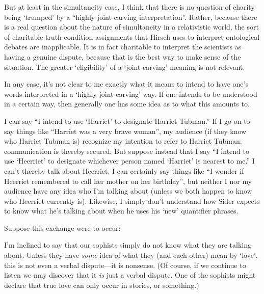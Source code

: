\documentclass[11pt]{article}
\begin{document}
\begin{spacing}{1.25}
But at least in the simultaneity case, I think that there is no
question of charity being `trumped' by a ``highly joint-carving
interpretation''.  Rather, because there is a real question about the
nature of simultaneity in a relativistic world, the sort of charitable
truth-condition assignments that Hirsch uses to interpret ontological
debates are inapplicable.  It is in fact charitable to interpret the
scientists as having a genuine dispute, because that is the best way
to make sense of the situation.  The greater `eligibility' of a
`joint-carving' meaning is not relevant.

In any case, it's not clear to me exactly what it means to intend to
have one's words interpreted in a `highly joint-carving' way.  If one
intends to be understood in a certain way, then generally one has some
idea as to what this amounts to.

I can say ``I intend to use `Harriet' to designate Harriet Tubman.''
If I go on to say things like ``Harriet was a very brave woman'', my
audience (if they know who Harriet Tubman is) recognize my intention
to refer to Harriet Tubman; communication is thereby secured.  But
suppose instead that I say ``I intend to use `Heerriet' to designate
whichever person named `Harriet' is nearest to me.''  I can't thereby
talk about Heerriet.  I can certainly say things like ``I wonder if
Heerriet remembered to call her mother on her birthday'', but neither
I nor my audience have any idea who I'm talking about (unless we both
happen to know who Heerriet currently is).  Likewise, I simply don't
understand how Sider expects to know what he's talking about when he
uses his `new' quantifier phrases.

Suppose this exchange were to occur:





I'm inclined to say that our sophists simply do not know what they are
talking about.  Unless they have {\em some} idea of what they (and
each other) mean by `love', this is not even a verbal dispute---it is
nonsense.  (Of course, if we continue to listen we may discover that
it {\em is} just a verbal dispute.  One of the sophists might declare that
true love can only occur in stories, or something.)


\end{spacing}
\end{document}
